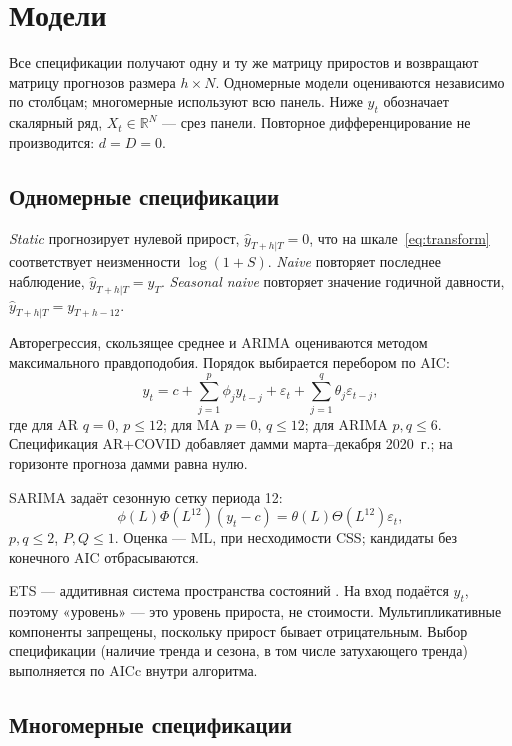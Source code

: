\documentclass[12pt]{article}
\begin{document}
\section{Модели}

Все спецификации получают одну и ту же матрицу приростов и возвращают матрицу прогнозов размера $h\times N$. Одномерные модели оцениваются независимо по столбцам; многомерные используют всю панель. Ниже $y_t$ обозначает скалярный ряд, $X_t\in\mathbb{R}^N$ --- срез панели. Повторное дифференцирование не производится: $d=D=0$.

\subsection{Одномерные спецификации}

\emph{Static} прогнозирует нулевой прирост, $\hat y_{T+h|T}=0$, что на шкале~\eqref{eq:transform} соответствует неизменности $\log(1+S)$. \emph{Naive} повторяет последнее наблюдение, $\hat y_{T+h|T}=y_T$. \emph{Seasonal naive} повторяет значение годичной давности, $\hat y_{T+h|T}=y_{T+h-12}$.

Авторегрессия, скользящее среднее и ARIMA оцениваются методом максимального правдоподобия. Порядок выбирается перебором по AIC:
\begin{equation}
y_t = c + \sum_{j=1}^{p}\phi_j y_{t-j} + \varepsilon_t + \sum_{j=1}^{q}\theta_j\varepsilon_{t-j},
\end{equation}
где для AR $q=0$, $p\le 12$; для MA $p=0$, $q\le 12$; для ARIMA $p,q\le 6$. Спецификация AR+COVID добавляет дамми марта--декабря 2020~г.; на горизонте прогноза дамми равна нулю.

SARIMA задаёт сезонную сетку периода 12:
\begin{equation}
\phi(L)\Phi(L^{12})(y_t-c)=\theta(L)\Theta(L^{12})\varepsilon_t,
\end{equation}
$p,q\le 2$, $P,Q\le 1$. Оценка --- ML, при несходимости CSS; кандидаты без конечного AIC отбрасываются.

ETS --- аддитивная система пространства состояний \citep{hyndman2002,hyndman2008}. На вход подаётся $y_t$, поэтому «уровень» --- это уровень прироста, не стоимости. Мультипликативные компоненты запрещены, поскольку прирост бывает отрицательным. Выбор спецификации (наличие тренда и сезона, в том числе затухающего тренда) выполняется по AICc внутри алгоритма.

\subsection{Многомерные спецификации}
\end{document}
